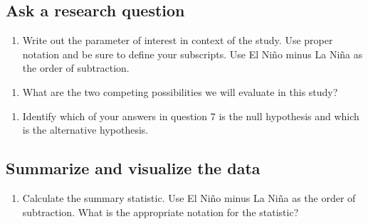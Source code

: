 \documentclass[
]{report}
\providecommand{\tightlist}{%
  \setlength{\itemsep}{0pt}\setlength{\parskip}{0pt}}
\begin{document}
\vspace{1in}

\hypertarget{ask-a-research-question}{%
\subsection*{Ask a research question}\label{ask-a-research-question}}

\begin{enumerate}
\def\labelenumi{\arabic{enumi}.}
\setcounter{enumi}{5}
\tightlist
\item
  Write out the parameter of interest in context of the study. Use proper notation and be sure to define your subscripts. Use El Ni\~{n}o minus La Ni\~{n}a as the order of subtraction.
\end{enumerate}

\vspace{1in}

\begin{enumerate}
\def\labelenumi{\arabic{enumi}.}
\setcounter{enumi}{6}
\tightlist
\item
  What are the two competing possibilities we will evaluate in this study?
\end{enumerate}

\vspace{1in}

\begin{enumerate}
\def\labelenumi{\arabic{enumi}.}
\setcounter{enumi}{7}
\tightlist
\item
  Identify which of your answers in question 7 is the null hypothesis and which is the alternative hypothesis.
\end{enumerate}

\vspace{1in}

\hypertarget{summarize-and-visualize-the-data}{%
\subsection*{Summarize and visualize the data}\label{summarize-and-visualize-the-data}}

\begin{enumerate}
\def\labelenumi{\arabic{enumi}.}
\setcounter{enumi}{8}
\tightlist
\item
  Calculate the summary statistic. Use El Ni\~{n}o minus La Ni\~{n}a as the order of subtraction. What is the appropriate notation for the statistic?
\end{enumerate}
\end{document}
